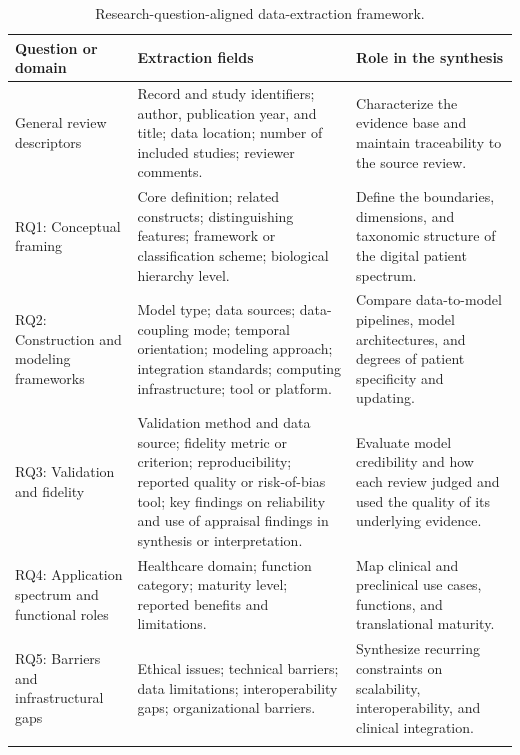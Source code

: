 \begin{table}[!htbp]
\centering
\small
\caption{Research-question-aligned data-extraction framework.}
\label{tab:extraction-framework}
\begin{tabularx}{\textwidth}{@{}>{\raggedright\arraybackslash}p{}YY@{}}
\toprule
\textbf{Question or domain} & \textbf{Extraction fields} & \textbf{Role in the synthesis} \\
\midrule
General review descriptors &
Record and study identifiers; author, publication year, and title; data location; number of included studies; reviewer comments. &
Characterize the evidence base and maintain traceability to the source review. \\
\addlinespace[0.45em]

RQ1: Conceptual framing &
Core definition; related constructs; distinguishing features; framework or classification scheme; biological hierarchy level. &
Define the boundaries, dimensions, and taxonomic structure of the digital patient spectrum. \\
\addlinespace[0.45em]

RQ2: Construction and modeling frameworks &
Model type; data sources; data-coupling mode; temporal orientation; modeling approach; integration standards; computing infrastructure; tool or platform. &
Compare data-to-model pipelines, model architectures, and degrees of patient specificity and updating. \\
\addlinespace[0.45em]

RQ3: Validation and fidelity &
Validation method and data source; fidelity metric or criterion; reproducibility; reported quality or risk-of-bias tool; key findings on reliability and use of appraisal findings in synthesis or interpretation. &
Evaluate model credibility and how each review judged and used the quality of its underlying evidence. \\
\addlinespace[0.45em]

RQ4: Application spectrum and functional roles &
Healthcare domain; function category; maturity level; reported benefits and limitations. &
Map clinical and preclinical use cases, functions, and translational maturity. \\
\addlinespace[0.45em]

RQ5: Barriers and infrastructural gaps &
Ethical issues; technical barriers; data limitations; interoperability gaps; organizational barriers. &
Synthesize recurring constraints on scalability, interoperability, and clinical integration. \\
\addlinespace[0.45em]


\end{tabularx}
\end{table}
